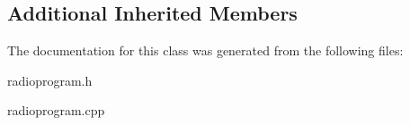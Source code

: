 \subsection*{Additional Inherited Members}


The documentation for this class was generated from the following files\+:\begin{DoxyCompactItemize}
\item 
radioprogram.\+h\item 
radioprogram.\+cpp\end{DoxyCompactItemize}
